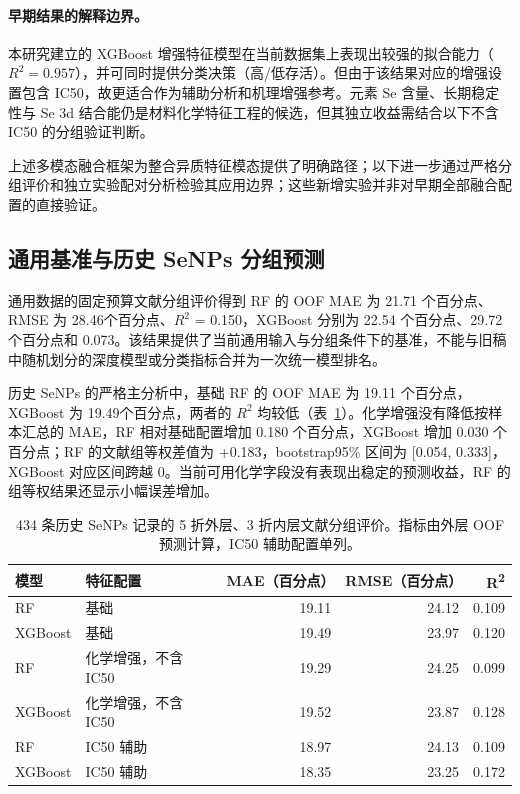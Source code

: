 \documentclass[letterpaper]{article}
\begin{document}
\paragraph{早期结果的解释边界。}
本研究建立的 XGBoost 增强特征模型在当前数据集上表现出较强的拟合能力（$R^2=0.957$），并可同时提供分类决策（高/低存活）。但由于该结果对应的增强设置包含 IC50，故更适合作为辅助分析和机理增强参考。元素 Se 含量、长期稳定性与 Se 3d 结合能仍是材料化学特征工程的候选，但其独立收益需结合以下不含 IC50 的分组验证判断。

上述多模态融合框架为整合异质特征模态提供了明确路径；以下进一步通过严格分组评价和独立实验配对分析检验其应用边界；这些新增实验并非对早期全部融合配置的直接验证。



\subsection{通用基准与历史 SeNPs 分组预测}

通用数据的固定预算文献分组评价得到 RF 的 OOF MAE 为 21.71 个百分点、RMSE 为 28.46个百分点、$R^2$ = 0.150，XGBoost 分别为 22.54 个百分点、29.72 个百分点和 0.073。该结果提供了当前通用输入与分组条件下的基准，不能与旧稿中随机划分的深度模型或分类指标合并为一次统一模型排名。

历史 SeNPs 的严格主分析中，基础 RF 的 OOF MAE 为 19.11 个百分点，XGBoost 为 19.49个百分点，两者的 $R^2$ 均较低（表~\ref{tab:senp_main_results}）。化学增强没有降低按样本汇总的 MAE，RF 相对基础配置增加 0.180 个百分点，XGBoost 增加 0.030 个百分点；RF 的文献组等权差值为 +0.183，bootstrap95\% 区间为 [0.054, 0.333]，XGBoost 对应区间跨越 0。当前可用化学字段没有表现出稳定的预测收益，RF 的组等权结果还显示小幅误差增加。

\begin{table}[H]
\centering
\caption{434 条历史 SeNPs 记录的 5 折外层、3 折内层文献分组评价。指标由外层 OOF 预测计算，IC50 辅助配置单列。}
\label{tab:senp_main_results}
\small
\begin{tabular}{llrrr}
\toprule
模型 & 特征配置 & MAE（百分点） & RMSE（百分点） & R\textsuperscript{2} \\
\midrule
RF & 基础 & 19.11 & 24.12 & 0.109 \\
XGBoost & 基础 & 19.49 & 23.97 & 0.120 \\
RF & 化学增强，不含 IC50 & 19.29 & 24.25 & 0.099 \\
XGBoost & 化学增强，不含 IC50 & 19.52 & 23.87 & 0.128 \\
RF & IC50 辅助 & 18.97 & 24.13 & 0.109 \\
XGBoost & IC50 辅助 & 18.35 & 23.25 & 0.172 \\
\bottomrule
\end{tabular}

\end{table}
\end{document}
